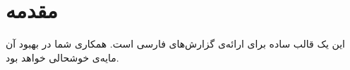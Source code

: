 



\tableofcontents
\pagebreak

\section{مقدمه}
این یک قالب ساده برای ارائه‌ی گزارش‌های فارسی است. همکاری شما در بهبود آن مایه‌ی خوشحالی خواهد بود.

